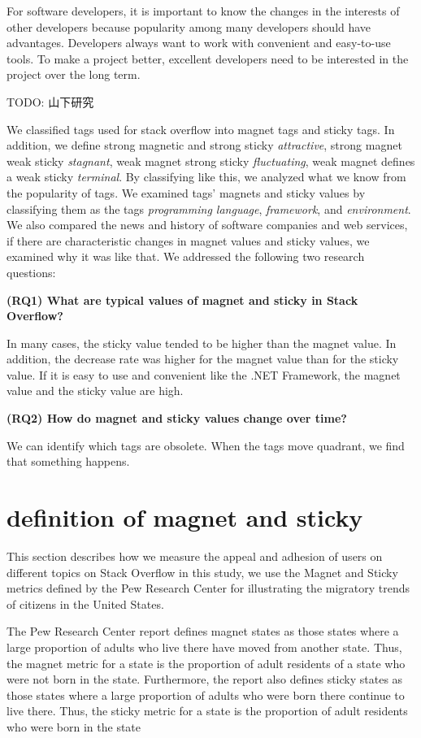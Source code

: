 \documentclass[english,preprint,JIP]{ipsj}
\begin{document}
For software developers, it is important to know the changes in the interests of other developers because popularity among many developers should have advantages. Developers always want to work with convenient and easy-to-use tools. To make a project better, excellent developers need to be interested in the project over the long term.

TODO: 山下研究

We classified tags used for stack overflow into magnet tags and sticky tags. In addition, we define strong magnetic and strong sticky \emph{attractive}, strong magnet weak sticky \emph{stagnant}, weak magnet strong sticky \emph{fluctuating}, weak magnet defines a weak sticky \emph{terminal}. By classifying like this, we analyzed what we know from the popularity of tags. We examined tags' magnets and sticky values by classifying them as the tags \emph{programming language}, \emph{framework}, and \emph{environment}. We also compared the news and history of software companies and web services, if there are characteristic changes in magnet values and sticky values, we examined why it was like that. We addressed the following two research questions:

\textbf{(RQ1) What are typical values of magnet and sticky in Stack Overflow?}\par
In many cases, the sticky value tended to be higher than the magnet value. In addition, the decrease rate was higher for the magnet value than for the sticky value. If it is easy to use and convenient like the .NET Framework, the magnet value and the sticky value are high.

\textbf{(RQ2) How do magnet and sticky values change over time?}\par
We can identify which tags are obsolete. When the tags move quadrant, we find that something happens.


\section{definition of magnet and sticky}
This section describes how we measure the appeal and adhesion of users on different topics on Stack Overflow in this study, we use the Magnet and Sticky metrics defined by the Pew Research Center for illustrating the migratory trends of citizens in the United States.

The Pew Research Center report defines magnet states as those states where a large proportion of adults who live there have moved from another state. Thus, the magnet metric for a state is the proportion of adult residents of a state who were not born in the state. Furthermore, the report also defines sticky states as those states where a large proportion of adults who were born there continue to live there. Thus, the sticky metric for a state is the proportion of adult residents who were born in the state
\end{document}
